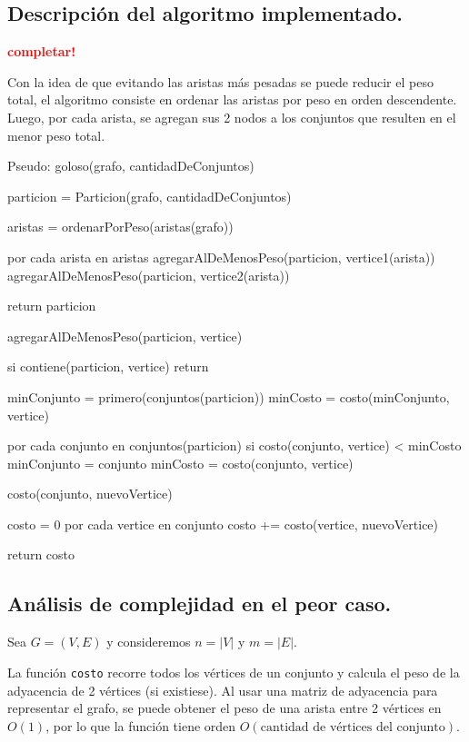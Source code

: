 \subsection{Descripción del algoritmo implementado.}
\vspace*{0.3cm}

\textcolor{red}{\textbf{completar!}}

Con la idea de que evitando las aristas más pesadas se puede reducir el peso
total, el algoritmo consiste en ordenar las aristas por peso en orden
descendente. Luego, por cada arista, se agregan sus 2 nodos a los conjuntos que
resulten en el menor peso total.

Pseudo:
goloso(grafo, cantidadDeConjuntos) {
	particion = Particion(grafo, cantidadDeConjuntos)

	aristas = ordenarPorPeso(aristas(grafo))

	por cada arista en aristas {
		agregarAlDeMenosPeso(particion, vertice1(arista))
		agregarAlDeMenosPeso(particion, vertice2(arista))
	}

	return particion
}

agregarAlDeMenosPeso(particion, vertice) {
	si contiene(particion, vertice)
		return

	minConjunto = primero(conjuntos(particion))
	minCosto = costo(minConjunto, vertice)

	por cada conjunto en conjuntos(particion) {
		si costo(conjunto, vertice) < minCosto {
			minConjunto = conjunto
			minCosto = costo(conjunto, vertice)
		}
	}
}

costo(conjunto, nuevoVertice) {
	costo = 0
	por cada vertice en conjunto {
		costo += costo(vertice, nuevoVertice)
	}

	return costo
}


\newpage
\subsection{Análisis de complejidad en el peor caso.}
\vspace*{0.3cm}

Sea $G = (V, E)$ y consideremos $n = |V|$ y $m = |E|$.

La función \texttt{costo} recorre todos los vértices de un conjunto y calcula
el peso de la adyacencia de 2 vértices (si existiese). Al usar una matriz de
adyacencia para representar el grafo, se puede obtener el peso de una arista
entre 2 vértices en $O(1)$, por lo que la función tiene orden $O(\text{cantidad
de vértices del conjunto})$.

